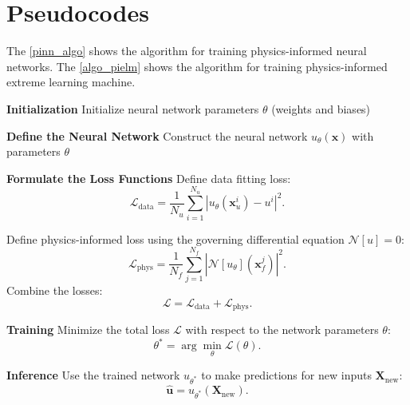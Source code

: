 \documentclass{article}
\begin{document}
\section{Pseudocodes}
The \cref{pinn_algo} shows the algorithm for training physics-informed neural networks. The \cref{algo_pielm} shows the algorithm for training physics-informed extreme learning machine.
\begin{algorithm}[!h]
\caption{PINN}
\begin{algorithmic}[1]
\label{pinn_algo}

\STATE \textbf{Initialization}
Initialize neural network parameters $\theta$ (weights and biases)

\STATE \textbf{Define the Neural Network}
Construct the neural network $u_\theta(\mathbf{x})$ with parameters $\theta$

\STATE \textbf{Formulate the Loss Functions}
Define data fitting loss:
\begin{equation}
\label{eq: datafit}
\mathcal{L}_{\text{data}} = \frac{1}{N_u} \sum_{i=1}^{N_u} \left| u_\theta(\mathbf{x}_u^i) - u^i \right|^2.
\end{equation}

Define physics-informed loss using the governing differential equation $\mathcal{N}[u] = 0$:
\begin{equation}
\label{eq: pdefit}
\mathcal{L}_{\text{phys}} = \frac{1}{N_f} \sum_{j=1}^{N_f} \left| \mathcal{N}[u_\theta](\mathbf{x}_f^j) \right|^2.
\end{equation}
Combine the losses:
\begin{equation}
\label{eq: multiobj}
\mathcal{L} = \mathcal{L}_{\text{data}} + \mathcal{L}_{\text{phys}}.
\end{equation}

\STATE \textbf{Training}
Minimize the total loss $\mathcal{L}$ with respect to the network parameters $\theta$:
\begin{equation}
\theta^* = \arg\min_\theta \mathcal{L}(\theta).
\end{equation}

\STATE \textbf{Inference}
Use the trained network $u_{\theta^*}$ to make predictions for new inputs $\mathbf{X}_{\text{new}}$:
\begin{equation}
\mathbf{\hat{u}} = u_{\theta^*}(\mathbf{X}_{\text{new}}).
\end{equation}

\end{algorithmic}
\end{algorithm}
\end{document}
